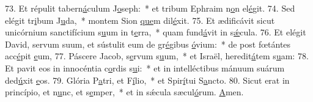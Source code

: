 73. Et répulit tabern\uline{á}culum J\uline{o}seph:~* et tribum Ephraim n\uline{o}n el\uline{é}git.
74. Sed elégit tr\uline{i}bum J\uline{u}da,~* montem Sion \uline{que}m dil\uline{é}xit.
75. Et ædificávit sicut unicórnium sanctifícium s\uline{u}um in t\uline{e}rra,~* quam fund\uline{á}vit in s\uline{ǽ}cula.
76. Et elégit David, servum suum, et sústulit eum de gr\uline{é}gibus \uline{ó}vium:~* de post fœtántes acc\uline{é}pit \uline{e}um,
77. Páscere Jacob, s\uline{e}rvum s\uline{u}um,~* et Israël, heredit\uline{á}tem s\uline{u}am:
78. Et pavit eos in innocéntia c\uline{o}rdis s\uline{u}i:~* et in intelléctibus mánuum suárum ded\uline{ú}xit \uline{e}os.
79. Glória P\uline{a}tri, et F\uline{í}lio,~* et Spir\uline{í}tui S\uline{a}ncto.
80. Sicut erat in princípio, et n\uline{u}nc, et s\uline{e}mper,~* et in sǽcula sæcul\uline{ó}rum. \uline{A}men.
